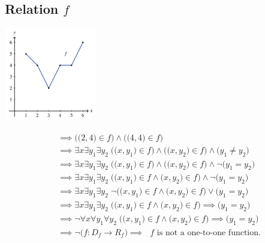 \documentclass[12pt, letterpaper]{article}
\begin{document}
        \subsection{Relation \(f\) }
        \begin{center}
            \includegraphics[width=0.3\textwidth]{relation_f.png}
        \end{center}
        \begin{align*}
            & \implies \Big(\big(2, 4\big) \in f\Big) \wedge \Big(\big(4, 4\big) \in f\Big) \\ 
            & \implies \exists x \exists y_1 \exists y_2 \; \Big( \big(x, y_1\big) \in f \Big) \wedge
                                                   \Big( \big(x, y_2\big) \in f \Big) \wedge
                                                   \Big( y_1 \neq y_2 \Big) \\
            & \implies \exists x \exists y_1 \exists y_2 \; \Big( \big(x, y_1\big) \in f \Big) \wedge
                                                   \Big( \big(x, y_2\big) \in f \Big) \wedge
                                                   \neg\Big( y_1 = y_2 \Big) \\
            & \implies \exists x \exists y_1 \exists y_2 \; \Big( \big(x, y_1\big) \in f \wedge
                                                   \big(x, y_2\big) \in f \Big) \wedge
                                                   \neg\Big( y_1 = y_2 \Big) \\
            & \implies \exists x \exists y_1 \exists y_2 \; \neg\Big( \big(x, y_1\big) \in f \wedge
                                                   \big(x, y_2\big) \in f \Big) \lor
                                                   \Big( y_1 = y_2 \Big) \\
            & \implies \exists x \exists y_1 \exists y_2 \; \Big( \big(x, y_1\big) \in f \wedge
                                                   \big(x, y_2\big) \in f \Big) \implies
                                                   \Big( y_1 = y_2 \Big) \\
            & \implies \neg\forall x \forall y_1 \forall y_2 \; \Big( \big(x, y_1\big) \in f \wedge
                                                   \big(x, y_2\big) \in f \Big) \implies
                                                   \Big( y_1 = y_2 \Big) \\
            & \implies \neg\Big( f : D_{f} \to R_{f} \Big)
              \implies \text{ \(f\) is not a one-to-one function.}
        \end{align*}
\end{document}
